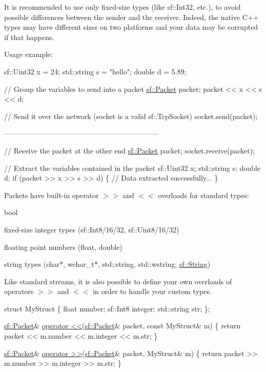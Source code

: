 It is recommended to use only fixed-\/size types (like sf\-::\-Int32, etc.), to avoid possible differences between the sender and the receiver. Indeed, the native C++ types may have different sizes on two platforms and your data may be corrupted if that happens.

Usage example\-: 
\begin{DoxyCode}
sf::Uint32 x = 24;
std::string s = \textcolor{stringliteral}{"hello"};
\textcolor{keywordtype}{double} d = 5.89;

\textcolor{comment}{// Group the variables to send into a packet}
\hyperlink{classsf_1_1Packet}{sf::Packet} packet;
packet << x << s << d;

\textcolor{comment}{// Send it over the network (socket is a valid sf::TcpSocket)}
socket.send(packet);

-----------------------------------------------------------------

\textcolor{comment}{// Receive the packet at the other end}
\hyperlink{classsf_1_1Packet}{sf::Packet} packet;
socket.receive(packet);

\textcolor{comment}{// Extract the variables contained in the packet}
sf::Uint32 x;
std::string s;
\textcolor{keywordtype}{double} d;
\textcolor{keywordflow}{if} (packet >> x >> s >> d)
\{
    \textcolor{comment}{// Data extracted successfully...}
\}
\end{DoxyCode}


Packets have built-\/in operator $>$$>$ and $<$$<$ overloads for standard types\-: \begin{DoxyItemize}
\item bool \item fixed-\/size integer types (sf\-::\-Int8/16/32, sf\-::\-Uint8/16/32) \item floating point numbers (float, double) \item string types (char$\ast$, wchar\-\_\-t$\ast$, std\-::string, std\-::wstring, \hyperlink{classsf_1_1String}{sf\-::\-String})\end{DoxyItemize}
Like standard streams, it is also possible to define your own overloads of operators $>$$>$ and $<$$<$ in order to handle your custom types.


\begin{DoxyCode}
\textcolor{keyword}{struct }MyStruct
\{
    \textcolor{keywordtype}{float}       number;
    sf::Int8    integer;
    std::string str;
\};

\hyperlink{classsf_1_1Packet}{sf::Packet}& \hyperlink{classsf_1_1Packet_aa5a465ed02ba29d83ecdafb0ac3fff21}{operator <<}(\hyperlink{classsf_1_1Packet}{sf::Packet}& packet, \textcolor{keyword}{const} MyStruct& m)
\{
    \textcolor{keywordflow}{return} packet << m.number << m.integer << m.str;
\}

\hyperlink{classsf_1_1Packet}{sf::Packet}& \hyperlink{classsf_1_1Packet_af8e26c63ba9bdccd262565ff0d3eeba2}{operator >>}(\hyperlink{classsf_1_1Packet}{sf::Packet}& packet, MyStruct& m)
\{
    \textcolor{keywordflow}{return} packet >> m.number >> m.integer >> m.str;
\}
\end{DoxyCode}


